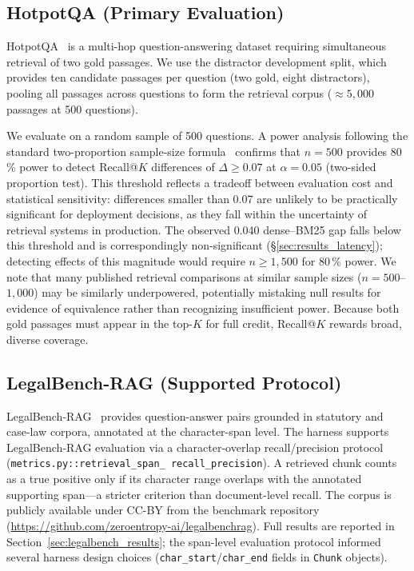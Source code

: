 \documentclass[11pt,a4paper]{article}
\begin{document}
\subsection{HotpotQA (Primary Evaluation)}

HotpotQA~\citep{yang2018hotpotqa} is a multi-hop question-answering dataset
requiring simultaneous retrieval of two gold passages.
We use the distractor development split, which provides ten candidate passages
per question (two gold, eight distractors), pooling all passages across
questions to form the retrieval corpus ($\approx\!5{,}000$ passages at 500
questions).

We evaluate on a random sample of 500 questions.
A power analysis following the standard two-proportion sample-size
formula~\citep{cohen1988power} confirms that $n = 500$ provides
80\,\% power to detect Recall@$K$ differences of
$\Delta \geq 0.07$ at $\alpha = 0.05$ (two-sided proportion test).
This threshold reflects a tradeoff between evaluation cost and
statistical sensitivity: differences smaller than 0.07 are unlikely
to be practically significant for deployment decisions, as they fall
within the uncertainty of retrieval systems in production.
The observed 0.040 dense--BM25 gap falls below this threshold and
is correspondingly non-significant (\S\ref{sec:results_latency});
detecting effects of this magnitude would require
$n \geq 1{,}500$ for 80\,\% power.
We note that many published retrieval comparisons at similar sample
sizes ($n = 500$--$1{,}000$) may be similarly underpowered,
potentially mistaking null results for evidence of equivalence
rather than recognizing insufficient power.
Because both gold passages must appear in the top-$K$ for full credit,
Recall@$K$ rewards broad, diverse coverage.

\subsection{LegalBench-RAG (Supported Protocol)}
\label{sec:legalbench}

LegalBench-RAG~\citep{pipitone2024legalbenchrag} provides question-answer pairs
grounded in statutory and case-law corpora, annotated at the character-span
level.
The harness supports LegalBench-RAG evaluation via a character-overlap
recall/precision protocol (\texttt{metrics.py::retrieval\_span\_%
recall\_precision}).
A retrieved chunk counts as a true positive only if its character range overlaps
with the annotated supporting span---a stricter criterion than document-level
recall.
The corpus is publicly available under CC-BY from the benchmark
repository (\url{https://github.com/zeroentropy-ai/legalbenchrag}).
Full results are reported in Section~\ref{sec:legalbench_results}; the
span-level evaluation protocol informed several harness design choices
(\texttt{char\_start}/\texttt{char\_end} fields in \texttt{Chunk} objects).
\end{document}
